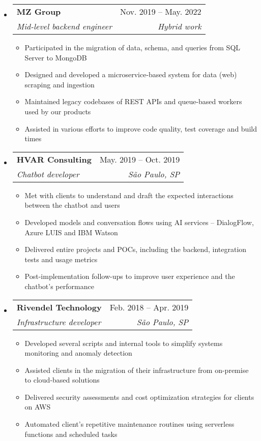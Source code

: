 \documentclass[letterpaper,12pt]{article}[leftmargin=*]
\makeatletter
\def \entryspacing {-0pt}
\newcommand{\resumeEntryStart}{\begin{itemize}[leftmargin=2.5mm]}
\newcommand{\resumeEntryEnd}{\end{itemize}\vspace{\entryspacing}}
\newcommand{\resumeItemListStart}{\begin{itemize}[leftmargin=4.5mm]}
\newcommand{\resumeItemListEnd}{\end{itemize}}
\newcommand{\resumeItem}[1]{
  \item\small{
    {#1 \vspace{-2pt}}
  }
}
\newcommand{\resumeEntryTSDL}[4]{
  \vspace{-1pt}\item[]
    \begin{tabularx}{0.97\textwidth}{X@{\hspace{60pt}}r}
      \textbf{\color{primary}#1} & {\firabook\color{accent}\small#2} \\
      \textit{\color{accent}\small#3} & \textit{\color{accent}\small#4} \\
    \end{tabularx}\vspace{-6pt}
}
\makeatother
\begin{document}
  \resumeEntryStart
    \resumeEntryTSDL
      {MZ Group}{Nov. 2019 -- May. 2022}
      {Mid-level backend engineer}{Hybrid work}
    \resumeItemListStart
      \resumeItem {Participated in the migration of data, schema, and queries from SQL Server to MongoDB}
      \resumeItem {Designed and developed a microservice-based system for data (web) scraping and ingestion}
      \resumeItem {Maintained legacy codebases of REST APIs and queue-based workers used by our products}
      \resumeItem {Assisted in various efforts to improve code quality, test coverage and build times}
    \resumeItemListEnd
  \resumeEntryEnd

  \resumeEntryStart
    \resumeEntryTSDL
      {HVAR Consulting}{May. 2019 -- Oct. 2019}
      {Chatbot developer}{São Paulo, SP}
    \resumeItemListStart
        \resumeItem {Met with clients to understand and draft the expected interactions between the chatbot and users}
        \resumeItem {Developed models and conversation flows using AI services -- DialogFlow, Azure LUIS and IBM Watson}
        \resumeItem {Delivered entire projects and POCs, including the backend, integration tests and usage metrics}
        \resumeItem {Post-implementation follow-ups to improve user experience and the chatbot's performance}
    \resumeItemListEnd
  \resumeEntryEnd

  \resumeEntryStart
    \resumeEntryTSDL
      {Rivendel Technology}{Feb. 2018 -- Apr. 2019}
      {Infrastructure developer}{São Paulo, SP}
    \resumeItemListStart
      \resumeItem {Developed several scripts and internal tools to simplify systems monitoring and anomaly detection}
      \resumeItem {Assisted clients in the migration of their infrastructure from on-premise to cloud-based solutions}
      \resumeItem {Delivered security assessments and cost optimization strategies for clients on AWS}
      \resumeItem {Automated client's repetitive maintenance routines using serverless functions and scheduled tasks}
    \resumeItemListEnd
  \resumeEntryEnd
\end{document}
